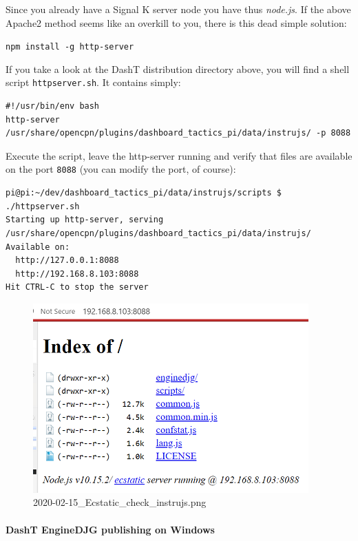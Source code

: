 \documentclass[11pt]{article}
\begin{document}
    Since you already have a Signal K server node you have thus
\emph{node.js}. If the above Apache2 method seems like an overkill to
you, there is this dead simple solution:

    \texttt{npm\ install\ -g\ http-server}

    If you take a look at the DashT distribution directory above, you will
find a shell script \texttt{httpserver.sh}. It contains simply:

    \begin{verbatim}
#!/usr/bin/env bash
http-server /usr/share/opencpn/plugins/dashboard_tactics_pi/data/instrujs/ -p 8088
\end{verbatim}

    Execute the script, leave the http-server running and verify that files
are available on the port \texttt{8088} (you can modify the port, of
course):

    \begin{verbatim}
pi@pi:~/dev/dashboard_tactics_pi/data/instrujs/scripts $ ./httpserver.sh 
Starting up http-server, serving /usr/share/opencpn/plugins/dashboard_tactics_pi/data/instrujs/
Available on:
  http://127.0.0.1:8088
  http://192.168.8.103:8088
Hit CTRL-C to stop the server
\end{verbatim}

    \begin{figure}
\centering
\includegraphics{2020-02-15_Ecstatic_check_instrujs.png}
\caption{2020-02-15\_Ecstatic\_check\_instrujs.png}
\end{figure}

    \hypertarget{dasht-enginedjg-publishing-on-windows}{%
\paragraph{DashT EngineDJG publishing on
Windows}\label{dasht-enginedjg-publishing-on-windows}}
\end{document}
